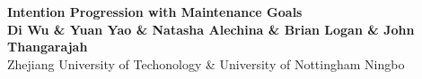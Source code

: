 \documentclass[a0,landscape]{a0poster}
\begin{document}


\begin{minipage}[b]{0.75\linewidth}
\veryHuge \color{NavyBlue} \textbf{Intention Progression with Maintenance Goals} \color{Black}\\ %
\huge \textbf{Di Wu \& Yuan Yao \& Natasha Alechina \& Brian Logan \& John Thangarajah}\\[0.5cm] %
\huge Zhejiang University of Techonology \& University of Nottingham Ningbo\\[0.4cm] %
\end{minipage}
%
\begin{minipage}[b]{0.25\linewidth}
\end{minipage}

\vspace{1cm} %

\end{document}
